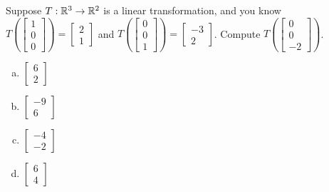 \begin{applicationActivities}{1}{17}
\begin{activity}{3}
Suppose $T: \mathbb{R}^3 \rightarrow \mathbb{R}^2$ is a linear transformation, and you know $T\left(\begin{bmatrix} 1 \\ 0 \\ 0 \end{bmatrix} \right) = \begin{bmatrix} 2 \\ 1 \end{bmatrix} $ and $T\left(\begin{bmatrix} 0 \\ 0 \\ 1 \end{bmatrix} \right) = \begin{bmatrix} -3 \\ 2 \end{bmatrix} $.  Compute $T\left(\begin{bmatrix} 0 \\ 0 \\ -2 \end{bmatrix}\right)$.
\begin{multicols}{2}
\begin{enumerate}[(a)]
\item $\begin{bmatrix} 6 \\ 2\end{bmatrix}$
\item $\begin{bmatrix} -9 \\ 6 \end{bmatrix}$
\item $\begin{bmatrix} -4 \\ -2 \end{bmatrix}$
\item $\begin{bmatrix} 6 \\ 4 \end{bmatrix}$
\end{enumerate}
\end{multicols}
\end{activity}


\end{applicationActivities}
